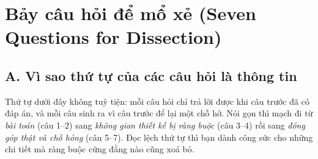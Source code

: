 \documentclass[../../deep_learning.tex]{subfiles}
\begin{document}
\section{Bảy câu hỏi để mổ xẻ (Seven Questions for Dissection)}

\subsection{A. Vì sao thứ tự của các câu hỏi là thông tin}
Thứ tự dưới đây không tuỳ tiện: mỗi câu hỏi chỉ trả lời được khi câu trước đã có đáp án, và mỗi câu sinh ra vì câu trước để lại một chỗ hở. Nói gọn thì mạch đi từ \emph{bài toán} (câu 1--2) sang \emph{không gian thiết kế bị ràng buộc} (câu 3--4) rồi sang \emph{đóng góp thật và chỗ hỏng} (câu 5--7). Đọc lệch thứ tự thì bạn dành công sức cho những chi tiết mà ràng buộc cứng đằng nào cũng xoá bỏ.
\end{document}
